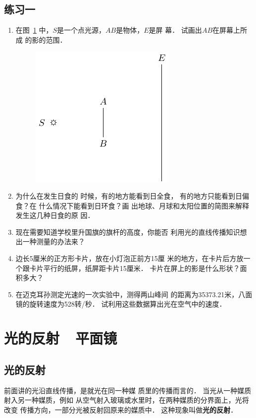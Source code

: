 \subsection*{练习一}
\begin{enumerate}
    \item 在图~\ref{fig_C_5-6} 中，$S$是一个点光源，$AB$是物体，$E$是屏
幕．
试画出$AB$在屏幕上所成
的影的范围．
\begin{figure}[htbp]
    \centering
    \includegraphics{fig/C/5-6.pdf}
    \caption{}\label{fig_C_5-6}
\end{figure}


\item 为什么在发生日食的
时候，有的地方能看到日全食，
有的地方只能看到日偏食？在
什么情况下能看到日环食？画
出地球、月球和太阳位置的简图来解释发生这几种日食的原
因．
\item 现在需要知道学校里升国旗的旗杆的高度，你能否
利用光的直线传播知识想出一种测量的办法来？
\item 边长5厘米的正方形卡片，放在小灯泡正前方15厘
米的地方，在卡片后方放一个跟卡片平行的纸屏，纸屏距卡片15厘米．
卡片在屏上的影是什么形状？面积多大？
\item 在迈克耳孙测定光速的一次实验中，测得两山峰间
的距离为35373.21米，八面镜的旋转速度为528转/秒．
试利用这些数据算出光在空气中的速度．
\end{enumerate}

\section{光的反射~~平面镜}
\subsection{光的反射}
前面讲的光沿直线传播，是就光在同一种媒
质里的传播而言的．
当光从一种媒质射入另一种媒质，例如
从空气射入玻璃或水里时，在两种媒质的分界面上，光将改变
传播方向，一部分光被反射回原来的媒质中．
这种现象叫做\textbf{光的反射}．

